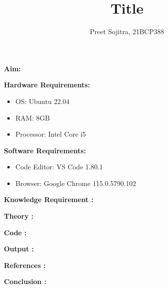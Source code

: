 \documentclass{article}
\title{\textbf{Title}} %
\author{Preet Sojitra, 21BCP388}
\date{} %
\begin{document}
\vspace{2pt}
\maketitle

\textbf{\large{Aim:}}

\vspace{1cm}
\textbf{\large{Hardware Requirements: }}
\begin{itemize}
    \item OS: Ubuntu 22.04
    \item RAM: 8GB
    \item Processor: Intel Core i5
\end{itemize}

\vspace{0.3cm}
\textbf{\large{Software Requirements: }}
\begin{itemize}
    \item Code Editor: VS Code 1.80.1
    \item Browser: Google Chrome 115.0.5790.102
\end{itemize}

\vspace{0.3cm}
\textbf{\large{Knowledge Requirement : }}

\vspace{0.6cm}
\textbf{\large{Theory : }}

\vspace{0.6cm}
\textbf{\large{Code : }}

\vspace{0.6cm}
\textbf{\large{Output : }}

\vspace{0.6cm}
\textbf{\large{References : }}

\vspace{0.6cm}
\textbf{\large{Conclusion : }}
\end{document}
